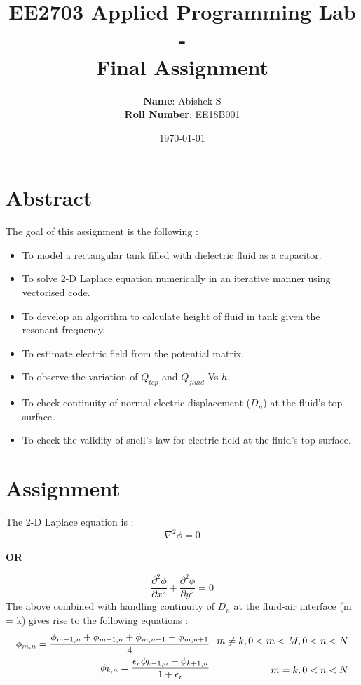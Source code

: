 \documentclass[11pt, a4paper]{article}
\title{EE2703 Applied Programming Lab - \\Final Assignment}
\author{
  \textbf{Name}: Abishek S\\
  \textbf{Roll Number}: EE18B001
}\date{\today}
\begin{document}
		
\maketitle 

\section{Abstract}
The goal of this assignment is the following :
\begin{itemize}
\item To model a rectangular tank filled with dielectric fluid as a capacitor.
\item To solve 2-D Laplace equation numerically in an iterative manner using vectorised code.
\item To develop an algorithm to calculate height of fluid in tank given the resonant frequency.
\item To estimate electric field from the potential matrix.
\item To observe the variation of $Q_{top}$ and $Q_{fluid}$ Vs $h$.
\item To check continuity of normal electric displacement ($D_n$) at the fluid's top surface.
\item To check the validity of snell's law for electric field at the fluid's top surface.
\end{itemize}

\section{Assignment}
The 2-D Laplace equation is :
\begin{equation*}
\nabla^2\phi = 0
\end{equation*}
\begin{center}
\textbf{OR}
\end{center}
\begin{equation*}
\frac{\partial^2\phi}{\partial x^2} + \frac{\partial^2\phi}{\partial y^2} = 0
\end{equation*}
The above combined with handling continuity of $D_n$ at the fluid-air interface (m = k) gives rise to the following equations :
\begin{equation*}\label{eq:1}
\begin{aligned}[c]
  \phi_{m,n} = \frac{\phi_{m-1,n} + \phi_{m+1,n} + \phi_{m,n-1} + \phi_{m,n+1}}{4}
  \\
  \phi_{k,n} = \frac{\epsilon_r\phi_{k-1,n} + \phi_{k+1,n}}{1 + \epsilon_r}
\end{aligned} 
\hspace{0.1in}  
\begin{aligned}[c]
  m \neq k,0 < m < M,0 < n < N 
  \\
  \\
  m = k,0 < n < N 
\end{aligned} 
\end{equation*}
\\
\end{document}
